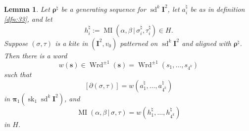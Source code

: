 \documentclass[10pt, a4paper]{amsart}
\newtheorem{lem}[equation]{Lemma}
\theoremstyle{definition}
\numberwithin{equation}{section}
\newcommand{\opn}{\operatorname}
\newcommand{\mbf}[1]{\mathbf{#1}}
\newcommand{\tup}[1]{\textup{#1}}
\newcommand{\bsym}[1]{\boldsymbol{#1}}
\renewcommand{\vert}{\, | \,}
\begin{document}
\begin{lem} \label{lem:12}
Let $\bsym{\rho}^{\natural}$ be a generating sequence for 
$\opn{sd}^k \mbf{I}^2$, let 
$a^{\natural}_i$ be as in definition \tup{\ref{dfn:33}}, and let
\[ h^{\natural}_i := \opn{MI} (\alpha, \beta \vert 
\sigma^{\natural}_i, \tau^{\natural}_i) \in H . \]
Suppose $(\sigma, \tau)$ is a kite in $(\mbf{I}^2, v_0)$ patterned on
$\opn{sd}^k \mbf{I}^2$ and aligned with $\bsym{\rho}^{\natural}$. Then there
is a word 
\[ w(\bsym{s}) \in \opn{Wrd}^{\pm 1}(\bsym{s}) = 
\opn{Wrd}^{\pm 1}(s_1, \ldots, s_{4^k}) \]
such that
\[ [\partial (\sigma, \tau)] = 
w(a^{\natural}_1, \ldots, a^{\natural}_{4^k} ) \]
in $\bsym{\pi}_1(\opn{sk}_1 \opn{sd}^k \mbf{I}^2)$, and 
\[ \opn{MI} (\alpha, \beta \vert \sigma, \tau) = 
w(h^{\natural}_1, \ldots, h^{\natural}_{4^k}) \]
in $H$. 
\end{lem}
\end{document}
